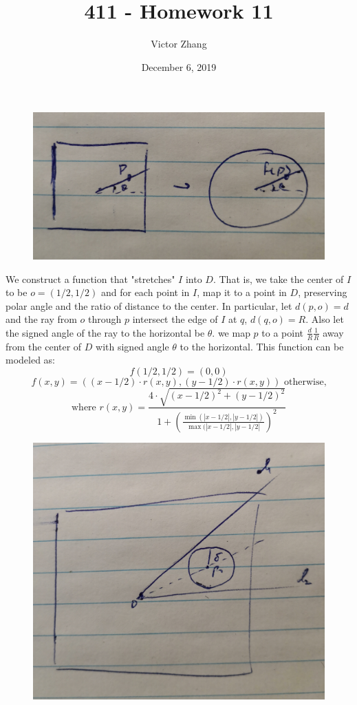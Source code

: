\documentclass{article}
\title{411 - Homework 11}
\author{Victor Zhang }
\date{December 6, 2019}
\begin{document}
\maketitle

\section{}
\begin{figure}
\includegraphics[width=0.9\linewidth]{fig1.jpg} 
\label{fig:wrapfig}
\end{figure}

We construct a function that "stretches" $I$ into $D$. That is, we take the center of $I$ to be $o = (1/2,1/2)$ and for each point in $I$, map it to a point in $D$, preserving polar angle and the ratio of distance to the center. In particular, let $d(p,o) = d$ and the ray from $o$ through $p$ intersect the edge of $I$ at $q$, $d(q,o) = R$. Also let the signed angle of the ray to the horizontal be $\theta$. we map $p$ to a point $\frac{d}{R}\frac{1}{R}$ away from the center of $D$ with signed angle $\theta$ to the horizontal. This function can be modeled as:
$$f(1/2,1/2) = (0,0)$$
$$f(x,y) = \left((x-1/2)\cdot r(x,y), (y-1/2)\cdot r(x,y) \right) \text{ otherwise,}$$
$$\text{where } r(x,y) = \frac{4\cdot\sqrt{(x-1/2)^2+(y-1/2)^2}}{1 + \left(\frac{\min(|x-1/2|,|y-1/2|)}{\max(|x-1/2|,|y-1/2|}\right)^2}$$
\begin{figure}[h!]
\centering
\includegraphics[scale=0.06]{fig2.jpg}
\label{fig:universe}
\end{figure}
\end{document}
